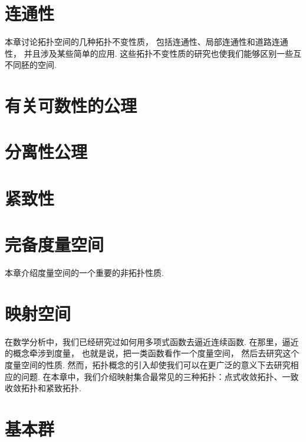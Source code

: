 \chapter{连通性}
本章讨论拓扑空间的几种拓扑不变性质，
包括连通性、局部连通性和道路连通性，
并且涉及某些简单的应用.
这些拓扑不变性质的研究也使我们能够区别一些互不同胚的空间.







\chapter{有关可数性的公理}




\chapter{分离性公理}







\chapter{紧致性}









\chapter{完备度量空间}
本章介绍度量空间的一个重要的非拓扑性质.




\chapter{映射空间}
在数学分析中，我们已经研究过如何用多项式函数去逼近连续函数.
在那里，逼近的概念牵涉到度量，
也就是说，把一类函数看作一个度量空间，
然后去研究这个度量空间的性质.
然而，拓扑概念的引入却使我们可以在更广泛的意义下去研究相应的问题.
在本章中，我们介绍映射集合最常见的三种拓扑：点式收敛拓扑、一致收敛拓扑和紧致拓扑.

\def\C{\mathscr{C}}  %






\chapter{基本群}

\endgroup

